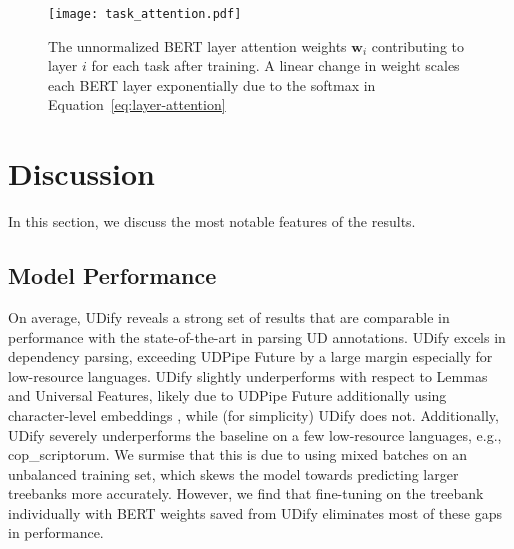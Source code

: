 \documentclass[11pt,a4paper]{article}
\renewcommand{\vec}[1]{\mathbold{#1}}
\begin{document}
\begin{figure}[tbp]
    \centering
    \texttt{[image: task\_attention.pdf]}
    \caption{\label{fig:bert-layer-weights}
        The unnormalized BERT layer attention weights $\vec{w}_i$ contributing to layer $i$ for each task after training.
        A linear change in weight scales each BERT layer exponentially due to the softmax in Equation~\ref{eq:layer-attention}
    }
\end{figure}

\section{Discussion}

In this section, we discuss the most notable features of the results.

\subsection{Model Performance}

On average, UDify reveals a strong set of results that are comparable in performance with the state-of-the-art in parsing UD annotations.
UDify excels in dependency parsing, exceeding UDPipe Future by a large margin especially for low-resource languages.
UDify slightly underperforms with respect to Lemmas and Universal Features, likely due to UDPipe Future additionally using character-level embeddings \cite{santos2014learning, ling2015finding, ballesteros2015improved, kim2016character}, while (for simplicity) UDify does not.
Additionally, UDify severely underperforms the baseline on a few low-resource languages, e.g., cop\_scriptorum.
We surmise that this is due to using mixed batches on an unbalanced training set, which skews the model towards predicting larger treebanks more accurately.
However, we find that fine-tuning on the treebank individually with BERT weights saved from UDify eliminates most of these gaps in performance.
\end{document}
